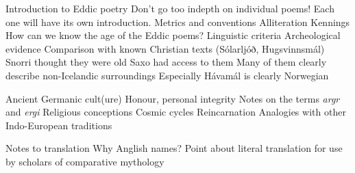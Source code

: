 Introduction to Eddic poetry
  Don't go too indepth on individual poems! Each one will have its own introduction.
  Metrics and conventions
    Alliteration
    Kennings
  How can we know the age of the Eddic poems?
    Linguistic criteria
    Archeological evidence
    Comparison with known Christian texts (Sólarljóð, Hugsvinnsmál)
    Snorri thought they were old
    Saxo had access to them
    Many of them clearly describe non-Icelandic surroundings
      Especially Hávamál is clearly Norwegian

Ancient Germanic cult(ure)
  Honour, personal integrity
  Notes on the terms \emph{argr} and \emph{ergi}
  Religious conceptions
    Cosmic cycles
    Reincarnation
    Analogies with other Indo-European traditions

Notes to translation
  Why Anglish names?
  Point about literal translation for use by scholars of comparative mythology

